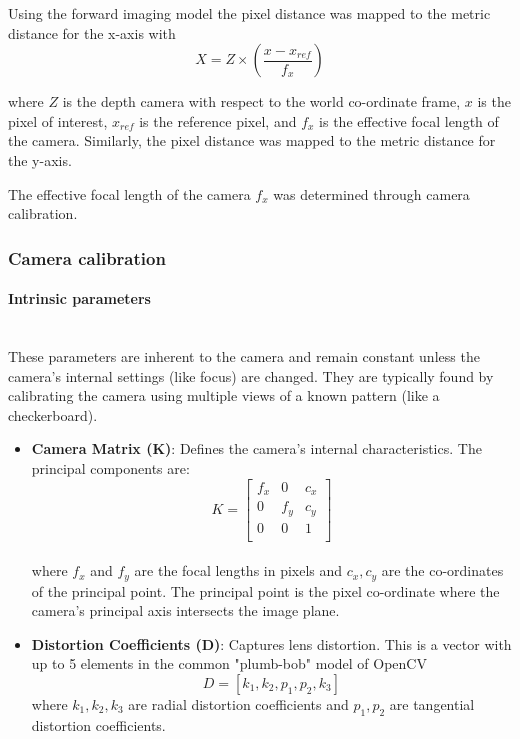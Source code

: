 Using the forward imaging model the pixel distance was mapped to the metric distance for the x-axis with
\begin{equation}
    X = Z \times \left( \frac{x - x_{ref}}{f_x} \right)
    \label{eq:pixel_to_metric}
\end{equation}

where $Z$ is the depth camera with respect to the world co-ordinate frame, $x$ is the pixel of interest, $x_{ref}$ is the reference pixel, and $f_x$ is the effective focal length of the camera. Similarly, the pixel distance was mapped to the metric distance for the y-axis.

The effective focal length of the camera $f_x$ was determined through camera calibration.

\subsubsection{Camera calibration}
\paragraph{Intrinsic parameters}\mbox{}\\
These parameters are inherent to the camera and remain constant unless the camera's internal settings (like focus) are changed. They are typically found by calibrating the camera using multiple views of a known pattern (like a checkerboard).

\begin{itemize}
    \item \textbf{Camera Matrix (K)}: Defines the camera's internal characteristics. The principal components are:
          \begin{equation}
              K = \begin{bmatrix}
                  f_x & 0   & c_x \\
                  0   & f_y & c_y \\
                  0   & 0   & 1   \\
              \end{bmatrix}
          \end{equation}\\
          where $f_x$ and $f_y$ are the focal lengths in pixels and $c_x, c_y$ are the co-ordinates of the principal point. The principal point is the pixel co-ordinate where the camera's principal axis intersects the image plane.

    \item \textbf{Distortion Coefficients (D)}: Captures lens distortion. This is a vector with up to 5 elements in the common "plumb-bob" model of OpenCV
          \[
              D = [k_1, k_2, p_1, p_2, k_3]
          \]
          where $k_1, k_2, k_3$ are radial distortion coefficients and $p_1, p_2$ are tangential distortion coefficients.
\end{itemize}

